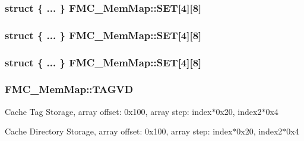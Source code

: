 \subsubsection[{\texorpdfstring{S\+ET}{SET}}]{\setlength{\rightskip}{0pt plus 5cm}struct \{ ... \}   F\+M\+C\+\_\+\+Mem\+Map\+::\+S\+ET\mbox{[}4\mbox{]}\mbox{[}8\mbox{]}}\hypertarget{struct_f_m_c___mem_map_a35571a66bfcd23043566e42a7f3dedf3}{}\label{struct_f_m_c___mem_map_a35571a66bfcd23043566e42a7f3dedf3}
\subsubsection[{\texorpdfstring{S\+ET}{SET}}]{\setlength{\rightskip}{0pt plus 5cm}struct \{ ... \}   F\+M\+C\+\_\+\+Mem\+Map\+::\+S\+ET\mbox{[}4\mbox{]}\mbox{[}8\mbox{]}}\hypertarget{struct_f_m_c___mem_map_a022afa677b59fb18514e1c7868ca0176}{}\label{struct_f_m_c___mem_map_a022afa677b59fb18514e1c7868ca0176}
\subsubsection[{\texorpdfstring{S\+ET}{SET}}]{\setlength{\rightskip}{0pt plus 5cm}struct \{ ... \}   F\+M\+C\+\_\+\+Mem\+Map\+::\+S\+ET\mbox{[}4\mbox{]}\mbox{[}8\mbox{]}}\hypertarget{struct_f_m_c___mem_map_ad953bb7a2bfb0c1a1d686a68b3755c9b}{}\label{struct_f_m_c___mem_map_ad953bb7a2bfb0c1a1d686a68b3755c9b}
\subsubsection[{\texorpdfstring{T\+A\+G\+VD}{TAGVD}}]{ F\+M\+C\+\_\+\+Mem\+Map\+::\+T\+A\+G\+VD}\hypertarget{struct_f_m_c___mem_map_a128170fe1e6d805804269b40d597122a}{}\label{struct_f_m_c___mem_map_a128170fe1e6d805804269b40d597122a}
Cache Tag Storage, array offset\+: 0x100, array step\+: index$\ast$0x20, index2$\ast$0x4

Cache Directory Storage, array offset\+: 0x100, array step\+: index$\ast$0x20, index2$\ast$0x4 

